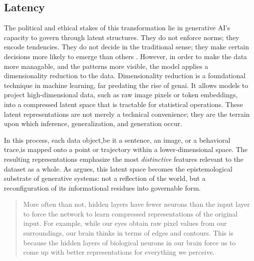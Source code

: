 \subsection{Latency}



The political and ethical stakes of this transformation lie in generative AI’s capacity to govern through latent structures. They do not enforce norms; they encode tendencies. They do not decide in the traditional sense; they make certain decisions more likely to emerge than others
.
However, in order to make the data more managable, and the patterns more visible, the model applies a dimensionality reduction to the data. Dimensionality reduction is a foundational technique in machine learning, far predating the rise of \gls{genai}. It allows models to project high-dimensional data, such as raw image pixels or token embeddings, into a compressed latent space that is tractable for statistical operations. These latent representations are not merely a technical convenience; they are the terrain upon which inference, generalization, and generation occur.

In this process, each data object,be it a sentence, an image, or a behavioral trace,is mapped onto a point or trajectory within a lower-dimensional space. The resulting representations emphasize the most \emph{distinctive} features relevant to the dataset as a whole. As \textcite[4]{amoore2024} argues, this latent space becomes the epistemological substrate of generative systems: not a reflection of the world, but a reconfiguration of its informational residues into governable form.


\begin{quote}
	More often than not, hidden layers have fewer neurons than the input layer to
	force the network to learn compressed representations of the original input.
	For example, while our eyes obtain raw pixel values from our surroundings,
	our brain thinks in terms of edges and contours. This is because the hidden
	layers of biological neurons in our brain force us to come up with better
	representations for everything we perceive. \parencite{buduma2022}
\end{quote}

